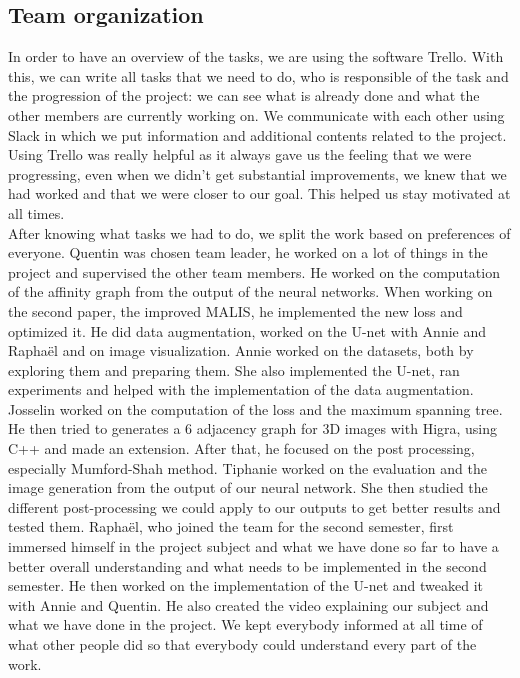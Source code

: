 \subsection{Team organization}

In order to have an overview of the tasks, we are using the software Trello.
With this, we can write all tasks that we need to do, who is responsible of
the task and the progression of the project: we can see what is already done
and what the other members are currently working on. We communicate with each
other using Slack in which we put information and additional contents related
to the project. \\
Using Trello was really helpful as it always gave us the feeling that we were
progressing, even when we didn't get substantial improvements, we knew that we
had worked and that we were closer to our goal. This helped us stay motivated
at all times.\\

After knowing what tasks we had to do, we split the work based on preferences of
everyone. 
Quentin was chosen team leader, he worked on a lot of things in the project and 
supervised the other team members. He worked on the computation of the affinity 
graph from the output of the neural networks. When working on the second paper,
the improved MALIS, he implemented the new loss and optimized it. He did data
augmentation, worked on the U-net with Annie and Raphaël and on image
visualization.
Annie worked on the datasets, both by exploring them and preparing them. She 
also implemented the U-net, ran experiments and helped with the implementation
of the data augmentation.
Josselin worked on the computation of the loss and the maximum spanning tree. 
He then tried to generates a 6 adjacency graph for 3D images with Higra, using 
C++ and made an extension. After that, he focused on the post processing,
especially Mumford-Shah method.
Tiphanie worked on the evaluation and the image generation from the output of
our neural network. She then studied the different post-processing we could apply
to our outputs to get better results and tested them.
Raphaël, who joined the team for the second semester, first immersed himself in the
project subject and what we have done so far to have a better overall understanding
and what needs to be implemented in the second semester. He then worked on the 
implementation of the U-net and tweaked it with Annie and Quentin. He also created
the video explaining our subject and what we have done in the project.
We kept everybody informed at all time of what other people did so that
everybody could understand every part of the work.\\

